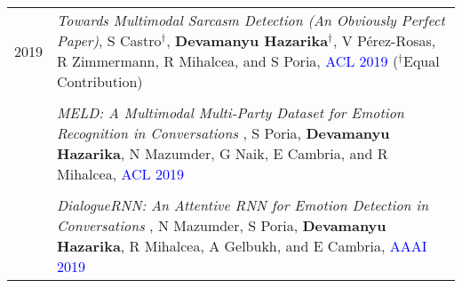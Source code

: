 \documentclass[a4paper,10pt]{article}
\begin{document}
\begin{tabular}{R{1cm}| L{12cm}}
    2019 & \textit{Towards Multimodal Sarcasm Detection (An Obviously Perfect Paper)}, \small{S Castro$^{\dagger}$, \textbf{Devamanyu Hazarika}$^{\dagger}$, V Pérez-Rosas, R Zimmermann, R Mihalcea, and S Poria},  \textcolor{blue}{\textsc{ACL 2019}} ($^{\dagger}$Equal Contribution) \\
    \\
    & \textit{MELD: A Multimodal Multi-Party Dataset for Emotion Recognition in Conversations} ,  \small{S Poria, \textbf{Devamanyu Hazarika}, N Mazumder, G Naik, E Cambria, and R Mihalcea},  \textcolor{blue}{\textsc{ACL 2019}}\\
    \\
    & \textit{DialogueRNN: An Attentive RNN for Emotion Detection in Conversations} ,  \small{N Mazumder, S Poria, \textbf{Devamanyu Hazarika}, R Mihalcea, A Gelbukh, and E Cambria},  \textcolor{blue}{\textsc{AAAI 2019}}\\
\end{tabular}
    
\end{document}
